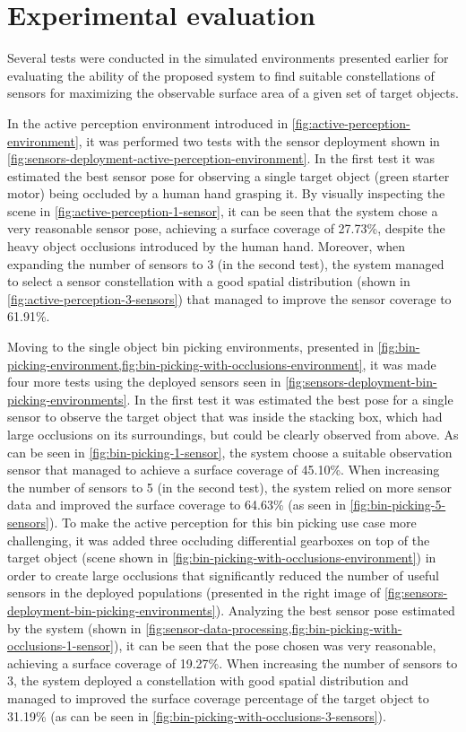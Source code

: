 \section{Experimental evaluation}\label{sec:results}

Several tests were conducted in the simulated environments presented earlier for evaluating the ability of the proposed system to find suitable constellations of sensors for maximizing the observable surface area of a given set of target objects.

In the active perception environment introduced in \cref{fig:active-perception-environment}, it was performed two tests with the sensor deployment shown in \cref{fig:sensors-deployment-active-perception-environment}. In the first test it was estimated the best sensor pose for observing a single target object (green starter motor) being occluded by a human hand grasping it. By visually inspecting the scene in \cref{fig:active-perception-1-sensor}, it can be seen that the system chose a very reasonable sensor pose, achieving a surface coverage of 27.73\%, despite the heavy object occlusions introduced by the human hand. Moreover, when expanding the number of sensors to 3 (in the second test), the system managed to select a sensor constellation with a good spatial distribution (shown in \cref{fig:active-perception-3-sensors}) that managed to improve the sensor coverage to 61.91\%.

Moving to the single object bin picking environments, presented in \cref{fig:bin-picking-environment,fig:bin-picking-with-occlusions-environment}, it was made four more tests using the deployed sensors seen in \cref{fig:sensors-deployment-bin-picking-environments}. In the first test it was estimated the best pose for a single sensor to observe the target object that was inside the stacking box, which had large occlusions on its surroundings, but could be clearly observed from above. As can be seen in \cref{fig:bin-picking-1-sensor}, the system choose a suitable observation sensor that managed to achieve a surface coverage of 45.10\%. When increasing the number of sensors to 5 (in the second test), the system relied on more sensor data and improved the surface coverage to 64.63\% (as seen in \cref{fig:bin-picking-5-sensors}). To make the active perception for this bin picking use case more challenging, it was added three occluding differential gearboxes on top of the target object (scene shown in \cref{fig:bin-picking-with-occlusions-environment}) in order to create large occlusions that significantly reduced the number of useful sensors in the deployed populations (presented in the right image of \cref{fig:sensors-deployment-bin-picking-environments}). Analyzing the best sensor pose estimated by the system (shown in \cref{fig:sensor-data-processing,fig:bin-picking-with-occlusions-1-sensor}), it can be seen that the pose chosen was very reasonable, achieving a surface coverage of 19.27\%. When increasing the number of sensors to 3, the system deployed a constellation with good spatial distribution and managed to improved the surface coverage percentage of the target object to 31.19\% (as can be seen in \cref{fig:bin-picking-with-occlusions-3-sensors}).

